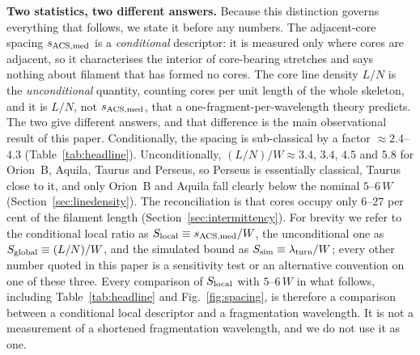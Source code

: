 \documentclass[usenatbib,twoside,twocolumn]{mnras}
\begin{document}
\smallskip\noindent\textbf{Two statistics, two different answers.} Because this distinction governs everything that follows, we state it before any numbers. The adjacent-core spacing $s_{\rm ACS,med}$ is a \emph{conditional} descriptor: it is measured only where cores are adjacent, so it characterises the interior of core-bearing stretches and says nothing about filament that has formed no cores. The core line density $L/N$ is the \emph{unconditional} quantity, counting cores per unit length of the whole skeleton, and it is $L/N$, not $s_{\rm ACS,med}$, that a one-fragment-per-wavelength theory predicts. The two give different answers, and that difference is the main observational result of this paper. Conditionally, the spacing is sub-classical by a factor $\approx2.4$--$4.3$ (Table~\ref{tab:headline}). Unconditionally, $(L/N)/W\approx3.4$, $3.4$, $4.5$ and $5.8$ for Orion~B, Aquila, Taurus and Perseus, so Perseus is essentially classical, Taurus close to it, and only Orion~B and Aquila fall clearly below the nominal $5$--$6\,W$ (Section~\ref{sec:linedensity}). The reconciliation is that cores occupy only $6$--$27$ per cent of the filament length (Section~\ref{sec:intermittency}). For brevity we refer to the conditional local ratio as $S_{\rm local}\equiv s_{\rm ACS,med}/W$, the unconditional one as $S_{\rm global}\equiv(L/N)/W$, and the simulated bound as $S_{\rm sim}\equiv\lambda_{\rm turn}/W$; every other number quoted in this paper is a sensitivity test or an alternative convention on one of these three. Every comparison of $S_{\rm local}$ with $5$--$6\,W$ in what follows, including Table~\ref{tab:headline} and Fig.~\ref{fig:spacing}, is therefore a comparison between a conditional local descriptor and a fragmentation wavelength. It is not a measurement of a shortened fragmentation wavelength, and we do not use it as one.
\end{document}
